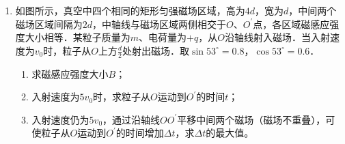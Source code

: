 \begin{enumerate}[leftmargin=0em]
\newpage
\item
{}
如图所示，真空中四个相同的矩形匀强磁场区域，高为$ 4d $，宽为$ d $，中间两个磁场区域间隔为$ 2d $，中轴线与磁场区域两侧相交于$ O $、$ O ^{\prime} $点，各区域磁感应强度大小相等．某粒子质量为$ m $、电荷量为$ +q $，从$ O $沿轴线射入磁场．当入射速度为$ v_{0} $时，粒子从$ O $上方$ \frac{d}{2} $处射出磁场．取$ \sin 53 ^{ \circ } =0.8 $，$ \cos 53 ^{ \circ } =0.6 $．
\begin{enumerate}
\renewcommand{\labelenumi}{\arabic{enumi}.}
\item
求磁感应强度大小$ B $；
\item 
入射速度为$ 5v_0 $时，求粒子从$ O $运动到$ O ^{\prime} $的时间$ t $；
\item 
入射速度仍为$ 5v_0 $，通过沿轴线$ OO ^{\prime} $平移中间两个磁场（磁场不重叠），可使粒子从$ O $运动到$ O ^{\prime} $的时间增加$ \Delta $$ t $，求$ \Delta $$ t $的最大值。

\end{enumerate}
\begin{figure}[h!]
\flushright

\end{figure}




\end{enumerate}

